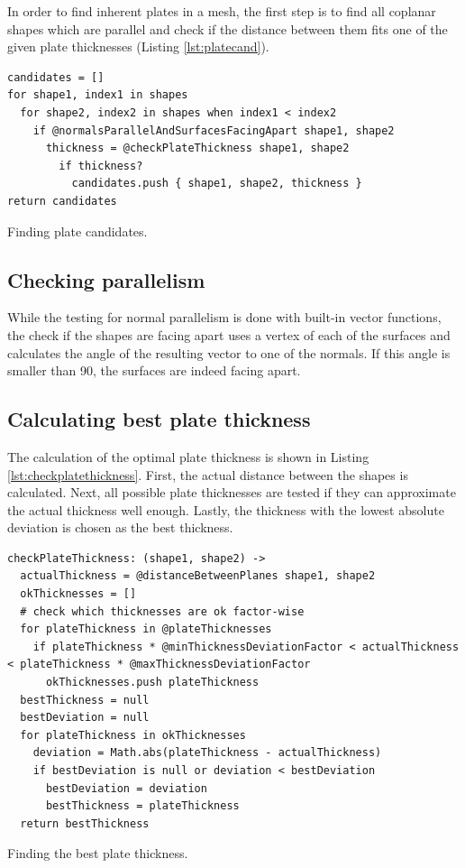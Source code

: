 \documentclass[../ClassicThesis.tex]{subfiles}
\begin{document}
In order to find inherent plates in a mesh, the first step is to find all coplanar shapes which are parallel and check if the distance between them fits one of the given plate thicknesses (Listing \ref{lst:platecand}).

\begin{listing}
\begin{verbatim}
candidates = []
for shape1, index1 in shapes
  for shape2, index2 in shapes when index1 < index2
    if @normalsParallelAndSurfacesFacingApart shape1, shape2
      thickness = @checkPlateThickness shape1, shape2
        if thickness?
          candidates.push { shape1, shape2, thickness }
return candidates
\end{verbatim}
\caption{Finding plate candidates.}
\label{lst:platecand}
\end{listing}

\subsection{Checking parallelism}

While the testing for normal parallelism is done with built-in vector functions, the check if the shapes are facing apart uses a vertex of each of the surfaces and calculates the angle of the resulting vector to one of the normals. If this angle is smaller than 90\textdegree, the surfaces are indeed facing apart.

\subsection{Calculating best plate thickness}

The calculation of the optimal plate thickness is shown in Listing \ref{lst:checkplatethickness}. First, the actual distance between the shapes is calculated. Next, all possible plate thicknesses are tested if they can approximate the actual thickness well enough. Lastly, the thickness with the lowest absolute deviation is chosen as the best thickness.

\begin{listing}
\begin{verbatim}
checkPlateThickness: (shape1, shape2) ->
  actualThickness = @distanceBetweenPlanes shape1, shape2
  okThicknesses = []
  # check which thicknesses are ok factor-wise
  for plateThickness in @plateThicknesses
    if plateThickness * @minThicknessDeviationFactor < actualThickness < plateThickness * @maxThicknessDeviationFactor
      okThicknesses.push plateThickness
  bestThickness = null
  bestDeviation = null
  for plateThickness in okThicknesses
    deviation = Math.abs(plateThickness - actualThickness)
    if bestDeviation is null or deviation < bestDeviation
      bestDeviation = deviation
      bestThickness = plateThickness
  return bestThickness
\end{verbatim}
\caption{Finding the best plate thickness.}
\label{lst:checkplatethickness}
\end{listing}
\end{document}
